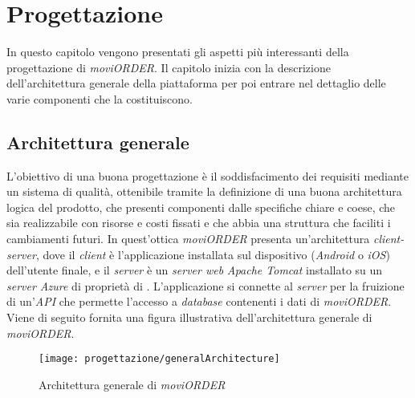 
\chapter{Progettazione}
\label{cap:progettazione-codifica}

In questo capitolo vengono presentati gli aspetti più interessanti della progettazione di \textit{moviORDER}. Il capitolo inizia con la descrizione dell'architettura generale della piattaforma per poi entrare nel dettaglio delle varie componenti che la costituiscono.

\section{Architettura generale}

L'obiettivo di una buona progettazione è il soddisfacimento dei requisiti mediante un sistema di qualità, ottenibile tramite la definizione di una buona architettura logica del prodotto, che presenti componenti dalle specifiche chiare e coese, che sia realizzabile con risorse e costi fissati e che abbia una struttura che faciliti i cambiamenti futuri. In quest'ottica \textit{moviORDER} presenta un'architettura \textit{client-server}, dove il \textit{client} è l'applicazione installata sul dispositivo (\textit{Android} o \textit{iOS}) dell'utente finale, e il \textit{server} è un \textit{server web} \textit{Apache Tomcat} installato su un \textit{server Azure} di proprietà di \visione{}. L'applicazione si connette al \textit{server} per la fruizione di un'\textit{API} che permette l'accesso a \textit{database} contenenti i dati di \textit{moviORDER}. Viene di seguito fornita una figura illustrativa dell'architettura generale di \textit{moviORDER}.

\newpage

\begin{figure}[!h] 
    \centering 
    \texttt{[image: progettazione/generalArchitecture]} 
    \caption{Architettura generale di \textit{moviORDER}}
\end{figure}


